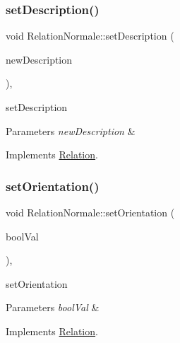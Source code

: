 \subsubsection{\texorpdfstring{set\+Description()}{setDescription()}}
{\footnotesize\ttfamily void Relation\+Normale\+::set\+Description (\begin{DoxyParamCaption}\item[{const Q\+String \&}]{new\+Description }\end{DoxyParamCaption})\hspace{0.3cm}{\ttfamily [inline]}, {\ttfamily [virtual]}}



set\+Description 


\begin{DoxyParams}{Parameters}
{\em new\+Description} & \\
\hline
\end{DoxyParams}


Implements \hyperlink{class_relation_a8f698cc45c38a849c4bcd8336fa5e2b3}{Relation}.

\mbox{\label{class_relation_normale_a1e660e212501ad0ddb38dc9949735cf2}} 
\subsubsection{\texorpdfstring{set\+Orientation()}{setOrientation()}}
{\footnotesize\ttfamily void Relation\+Normale\+::set\+Orientation (\begin{DoxyParamCaption}\item[{bool}]{bool\+Val }\end{DoxyParamCaption})\hspace{0.3cm}{\ttfamily [inline]}, {\ttfamily [virtual]}}



set\+Orientation 


\begin{DoxyParams}{Parameters}
{\em bool\+Val} & \\
\hline
\end{DoxyParams}


Implements \hyperlink{class_relation_a708a16e5b0dd280e64832ca1d042cd96}{Relation}.

\mbox{\label{class_relation_normale_abd0076a23f702ced9af181a0f046652c}} 
